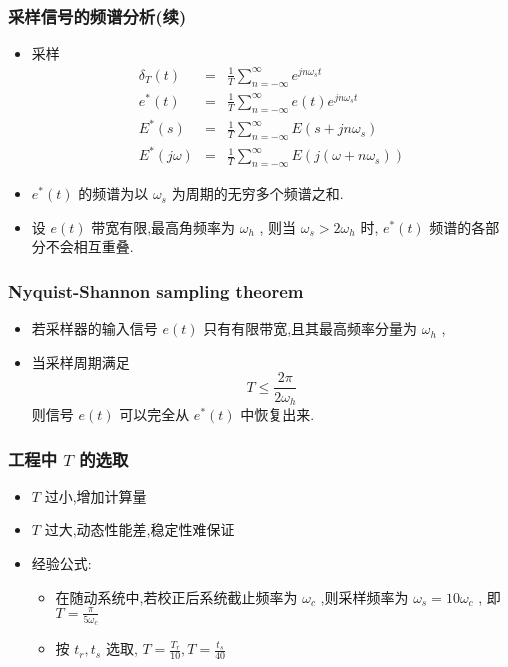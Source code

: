 \documentclass[table]{article}
\begin{document}
\begin{frame}
\frametitle{采样信号的频谱分析(续)}
\label{sec-2-1-4}


\begin{itemize}
\item 采样
      \begin{eqnarray*}
      \delta_T(t) &=& \frac{1}{T}\sum_{n=-\infty}^{\infty}e^{jn\omega_s t} \\
      e^*(t) &=& \frac{1}{T}\sum_{n=-\infty}^{\infty}e(t)e^{jn\omega_s t} \\
      E^*(s) &=& \frac{1}{T}\sum_{n=-\infty}^{\infty}E(s+jn\omega_s ) \\
      E^*(j\omega) &=& \frac{1}{T}\sum_{n=-\infty}^{\infty}E(j(\omega+n\omega_s)) 
      \end{eqnarray*}
\item <2->$e^*(t)$  的频谱为以  $\omega_s$  为周期的无穷多个频谱之和.
\item <3->设  $e(t)$ 带宽有限,最高角频率为  $\omega_h$ , 则当  $\omega_s>2\omega_h$  时,  $e^*(t)$  频谱的各部分不会相互重叠.
\end{itemize}
\end{frame}
\begin{frame}
\frametitle{Nyquist-Shannon sampling theorem}
\label{sec-2-1-5}

\begin{itemize}
\item <2->若采样器的输入信号  $e(t)$ 只有有限带宽,且其最高频率分量为  $\omega_h$  ,
\item <3->当采样周期满足  
	\[T\leq\frac{2\pi}{2\omega_h}\]  
    则信号  $e(t)$  可以完全从  $e^*(t)$  中恢复出来.
\end{itemize}
\end{frame}
\begin{frame}
\frametitle{工程中  $T$  的选取}
\label{sec-2-1-6}

\begin{itemize}
\item <2-> $T$  过小,增加计算量
\item <3-> $T$  过大,动态性能差,稳定性难保证
\item <4->经验公式:
\begin{itemize}
\item <4->在随动系统中,若校正后系统截止频率为  $\omega_c$ ,则采样频率为  $\omega_s=10\omega_c$  , 即  $T=\frac{\pi}{5\omega_c}$
\item <5->按  $t_r,t_s$  选取,   $T=\frac{T_r}{10},T=\frac{t_s}{40}$
\end{itemize}
\end{itemize}
\end{frame}
\end{document}
